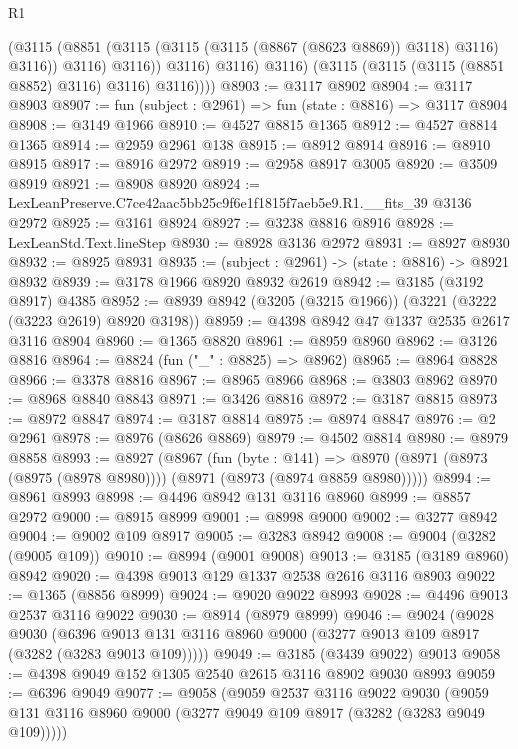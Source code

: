 \begin{lexlean}{R1}
\begin{coremodule}
                    (@3115
                      (@8851 (@3115 (@3115 (@3115 (@8867 (@8623 @8869)) @3118) @3116) @3116))
                      @3116)
                    @3116))
                @3116)
              @3116)
            @3116)
          (@3115 (@3115 (@3115 (@8851 @8852) @3116) @3116) @3116))))
@8903 := @3117 @8902
@8904 := @3117 @8903
@8907 := fun (subject : @2961) => fun (state : @8816) => @3117 @8904
@8908 := @3149 @1966
@8910 := @4527 @8815 @1365
@8912 := @4527 @8814 @1365
@8914 := @2959 @2961 @138
@8915 := @8912 @8914
@8916 := @8910 @8915
@8917 := @8916 @2972
@8919 := @2958 @8917 @3005
@8920 := @3509 @8919
@8921 := @8908 @8920
@8924 := LexLeanPreserve.C7ce42aac5bb25c9f6e1f1815f7aeb5e9.R1.__fits_39 @3136 @2972
@8925 := @3161 @8924
@8927 := @3238 @8816 @8916
@8928 := LexLeanStd.Text.lineStep
@8930 := @8928 @3136 @2972
@8931 := @8927 @8930
@8932 := @8925 @8931
@8935 := (subject : @2961) -> (state : @8816) -> @8921 @8932
@8939 := @3178 @1966 @8920 @8932 @2619
@8942 := @3185 (@3192 @8917) @4385
@8952 := @8939 @8942 (@3205 (@3215 @1966)) (@3221 (@3222 (@3223 @2619) @8920 @3198))
@8959 := @4398 @8942 @47 @1337 @2535 @2617 @3116 @8904
@8960 := @1365 @8820
@8961 := @8959 @8960
@8962 := @3126 @8816
@8964 := @8824 (fun ("_" : @8825) => @8962)
@8965 := @8964 @8828
@8966 := @3378 @8816
@8967 := @8965 @8966
@8968 := @3803 @8962
@8970 := @8968 @8840 @8843
@8971 := @3426 @8816
@8972 := @3187 @8815
@8973 := @8972 @8847
@8974 := @3187 @8814
@8975 := @8974 @8847
@8976 := @2 @2961
@8978 := @8976 (@8626 @8869)
@8979 := @4502 @8814
@8980 := @8979 @8858
@8993 := @8927
    (@8967
      (fun (byte : @141) =>
      @8970 (@8971 (@8973 (@8975 (@8978 @8980)))) (@8971 (@8973 (@8974 @8859 @8980)))))
@8994 := @8961 @8993
@8998 := @4496 @8942 @131 @3116 @8960
@8999 := @8857 @2972
@9000 := @8915 @8999
@9001 := @8998 @9000
@9002 := @3277 @8942
@9004 := @9002 @109 @8917
@9005 := @3283 @8942
@9008 := @9004 (@3282 (@9005 @109))
@9010 := @8994 (@9001 @9008)
@9013 := @3185 (@3189 @8960) @8942
@9020 := @4398 @9013 @129 @1337 @2538 @2616 @3116 @8903
@9022 := @1365 (@8856 @8999)
@9024 := @9020 @9022 @8993
@9028 := @4496 @9013 @2537 @3116 @9022
@9030 := @8914 (@8979 @8999)
@9046 := @9024
    (@9028
      @9030
      (@6396 @9013 @131 @3116 @8960 @9000 (@3277 @9013 @109 @8917 (@3282 (@3283 @9013 @109)))))
@9049 := @3185 (@3439 @9022) @9013
@9058 := @4398 @9049 @152 @1305 @2540 @2615 @3116 @8902 @9030 @8993
@9059 := @6396 @9049
@9077 := @9058
    (@9059
      @2537
      @3116
      @9022
      @9030
      (@9059 @131 @3116 @8960 @9000 (@3277 @9049 @109 @8917 (@3282 (@3283 @9049 @109)))))

\end{coremodule}
\end{lexlean}
